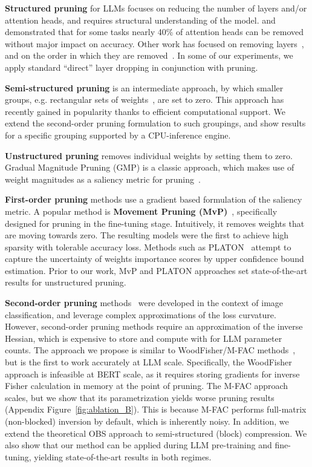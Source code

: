 \documentclass[11pt]{article}
\begin{document}
\noindent\textbf{Structured pruning} for LLMs focuses on reducing the number of layers and/or attention heads, and requires structural understanding of the model. 
\citet{Michel2019AreSH} and \citet{Voita2019AnalyzingMS} demonstrated that for some tasks nearly 40\% of attention heads can be removed without major impact on accuracy. 
Other work has focused on removing layers~\cite{Sridhar2020UndividedAA}, and on the order in which they are removed~\cite{DBLP:journals/corr/abs-2004-03844}. In some of our experiments, we apply standard ``direct'' layer dropping in conjunction with pruning.

\noindent\textbf{Semi-structured pruning} is an intermediate approach, by which smaller groups, e.g. rectangular sets of weights~\cite{lagunas21block}, are set to zero. This approach has recently gained in popularity thanks to efficient computational support. We extend the second-order pruning formulation to such groupings, and show results for a specific grouping supported by a CPU-inference engine.

\noindent\textbf{Unstructured pruning} removes individual weights by setting them to zero.
Gradual Magnitude Pruning (GMP) is a classic approach, which makes use of weight magnitudes as a saliency metric for pruning~\cite{Han2015ADN, Gale2019TheSO}.

\noindent\textbf{First-order pruning} methods use a gradient based formulation of the saliency metric. A popular method is \textbf{Movement Pruning (MvP)}~\cite{Sanh2020MovementPA}, specifically designed for pruning in the fine-tuning stage. Intuitively, it removes weights that are moving towards zero. The resulting models were the first to achieve high sparsity with tolerable accuracy loss. Methods such as PLATON~\cite{zhang2022platon} attempt to capture the uncertainty of weights importance scores by upper confidence bound estimation. Prior to our work, MvP and PLATON approaches set state-of-the-art results for unstructured pruning.

\noindent\textbf{Second-order pruning} methods~\cite{LeCun1989OptimalBD, hassibi1993second, Singh2020WoodFisherES, Frantar2021EfficientMA} were developed in the context of image classification, and leverage complex approximations of the loss curvature. 
However, second-order pruning methods require an approximation of the inverse Hessian, which is expensive to store and compute with for LLM parameter counts. The approach we propose is similar to  WoodFisher/M-FAC methods~\cite{Singh2020WoodFisherES, Frantar2021EfficientMA}, but is the first to work accurately at LLM scale. Specifically, the WoodFisher approach is infeasible at BERT scale, as it requires storing gradients for inverse Fisher calculation in memory at the point of pruning. 
The M-FAC approach scales, but we show that its parametrization yields worse pruning results (Appendix Figure~\ref{fig:ablation_B}). 
This is because M-FAC performs full-matrix (non-blocked) inversion by default, which is inherently noisy. 
In addition, we extend the theoretical OBS approach to semi-structured (block) compression. We also show that our method can be applied during LLM pre-training and fine-tuning, yielding state-of-the-art results in both regimes.
\end{document}
